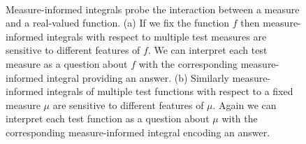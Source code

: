 \documentclass[
  letterpaper,
  DIV=11,
  numbers=noendperiod]{scrartcl}
\begin{document}
\begin{figure}
\begin{minipage}[t]{0.45\linewidth}
{\centering 


}

\subcaption{\label{fig-probing-measures}}
\end{minipage}%
%
\begin{minipage}[t]{0.05\linewidth}

{\centering 

~

}

\end{minipage}%

\caption{\label{fig-probes}Measure-informed integrals probe the
interaction between a measure and a real-valued function. (a) If we fix
the function \(f\) then measure-informed integrals with respect to
multiple test measures are sensitive to different features of \(f\). We
can interpret each test measure as a question about \(f\) with the
corresponding measure-informed integral providing an answer. (b)
Similarly measure-informed integrals of multiple test functions with
respect to a fixed measure \(\mu\) are sensitive to different features
of \(\mu\). Again we can interpret each test function as a question
about \(\mu\) with the corresponding measure-informed integral encoding
an answer.}

\end{figure}
\end{document}
